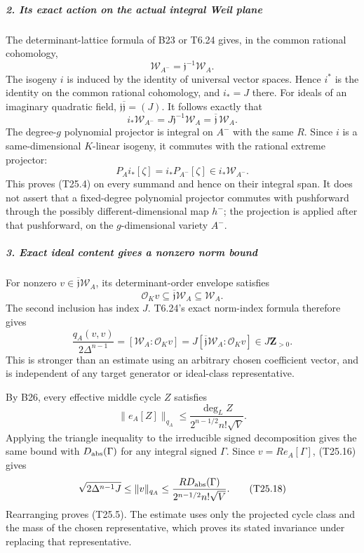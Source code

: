 \documentclass[11pt,a4paper]{article}
\theoremstyle{definition}
\begin{document}
\subparagraph{2. Its exact action on the actual integral Weil plane}\label{its-exact-action-on-the-actual-integral-weil-plane}

The determinant-lattice formula of B23 or T6.24 gives, in the common rational cohomology, \[
 \mathscr W_{A^-}=\mathfrak j^{-1}\mathscr W_A.
 \tag{T25.12}
\] The isogeny \(i\) is induced by the identity of universal vector spaces. Hence \(i^*\) is the identity on the common rational cohomology, and \(i_*=J\) there. For ideals of an imaginary quadratic field, \(\mathfrak j\overline{\mathfrak j}=(J)\). It follows exactly that \[
 i_*\mathscr W_{A^-}
       =J\mathfrak j^{-1}\mathscr W_A
       =\overline{\mathfrak j}\,\mathscr W_A.
 \tag{T25.13}
\] The degree-\(g\) polynomial projector is integral on \(A^-\) with the same \(R\). Since \(i\) is a same-dimensional \(K\)-linear isogeny, it commutes with the rational extreme projector: \[
 P_A i_*[\zeta]=i_* P_{A^-}[\zeta]
       \in i_*\mathscr W_{A^-}.
 \tag{T25.14}
\] This proves (T25.4) on every summand and hence on their integral span. It does not assert that a fixed-degree polynomial projector commutes with pushforward through the possibly different-dimensional map \(h^-\); the projection is applied after that pushforward, on the \(g\)-dimensional variety \(A^-\).

\subparagraph{3. Exact ideal content gives a nonzero norm bound}\label{exact-ideal-content-gives-a-nonzero-norm-bound}

For nonzero \(v\in\overline{\mathfrak j}\mathscr W_A\), its determinant-order envelope satisfies \[
 \mathcal O_K v\subseteq\overline{\mathfrak j}\mathscr W_A
                         \subseteq\mathscr W_A.
 \tag{T25.15}
\] The second inclusion has index \(J\). T6.24's exact norm-index formula therefore gives \[
 \frac{q_A(v,v)}{2\Delta^{n-1}}
     =[\mathscr W_A:\mathcal O_Kv]
     =J[\overline{\mathfrak j}\mathscr W_A:\mathcal O_Kv]
     \in J\mathbf Z_{>0}.
 \tag{T25.16}
\] This is stronger than an estimate using an arbitrary chosen coefficient vector, and is independent of any target generator or ideal-class representative.

By B26, every effective middle cycle \(Z\) satisfies \[
 \|e_A[Z]\|_{q_A}
    \le\frac{\deg_LZ}{2^{n-1/2}n!\sqrt V}.
 \tag{T25.17}
\] Applying the triangle inequality to the irreducible signed decomposition gives the same bound with \(D_{\rm abs}(\Gamma)\) for any integral signed \(\Gamma\). Since \(v=R e_A[\Gamma]\), (T25.16) gives \[
 \sqrt{2\Delta^{n-1}J}
 \le\|v\|_{q_A}
 \le\frac{R D_{\rm abs}(\Gamma)}
                {2^{n-1/2}n!\sqrt V}.
 \tag{T25.18}
\] Rearranging proves (T25.5). The estimate uses only the projected cycle class and the mass of the chosen representative, which proves its stated invariance under replacing that representative.
\end{document}
